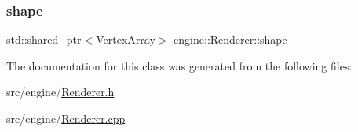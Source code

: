 \mbox{\label{classengine_1_1_renderer_ac4b6017a421699831e274ae0f7c5b126}} 
\subsubsection{\texorpdfstring{shape}{shape}}
{\footnotesize\ttfamily std\+::shared\+\_\+ptr$<$\mbox{\hyperlink{classengine_1_1_vertex_array}{Vertex\+Array}}$>$ engine\+::\+Renderer\+::shape\hspace{0.3cm}{\ttfamily [private]}}



The documentation for this class was generated from the following files\+:\begin{DoxyCompactItemize}
\item 
src/engine/\mbox{\hyperlink{_renderer_8h}{Renderer.\+h}}\item 
src/engine/\mbox{\hyperlink{_renderer_8cpp}{Renderer.\+cpp}}\end{DoxyCompactItemize}
